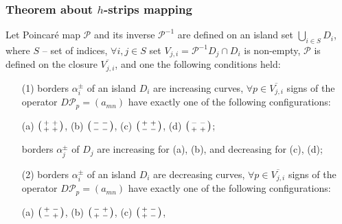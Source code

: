 \documentclass [10pt] {beamer}
\newenvironment{psm}
	{\left( \begin{smallmatrix}}
	{\end{smallmatrix} \right) }
\begin{document}
\begin{frame}
	\frametitle{Theorem about $h$-strips mapping}
	\begin{theorem}
		Let Poincar\'e map $\mathcal{P}$ and its inverse $\mathcal{P}^{-1}$ are defined on an island set $\bigcup_{i \in S} D_i$, where $S$ -- set of indices, $\forall i, j \in S$ set $V_{j,i} = \mathcal{P}^{-1} D_j \cap D_i$ is non-empty, $\mathcal{P}$ is defined on the closure $\overline{V_{j,i}}$, and one the following conditions held:
		\begin{enumerate}
			\item[(1)] borders $\alpha_i^{\pm}$ of an island $D_i$ are increasing curves, $\forall p \in \overline{V_{j,i}}$ signs of the operator $D \mathcal{P}_p = (a_{mn})$ have exactly one of the following configurations:
				\begin{center}
					(a) $\begin{psm} + & + \\ + & + \end{psm}$, \quad
					(b) $\begin{psm} - & - \\ - & - \end{psm}$, \quad
					(c) $\begin{psm} + & + \\ - & - \end{psm}$, \quad
					(d) $\begin{psm} - & - \\ + & + \end{psm}$;
				\end{center}
				borders $\alpha_j^{\pm}$ of $D_j$ are increasing for (a), (b), and decreasing for (c), (d);
			\item[(2)] borders $\alpha_i^{\pm}$ of an island $D_i$ are decreasing curves, $\forall p \in \overline{V_{j,i}}$ signs of the operator $D \mathcal{P}_p = (a_{mn})$ 	have exactly one of the following configurations:
				\begin{center}
					(a) $\begin{psm} + & - \\ - & + \end{psm}$, \quad
					(b) $\begin{psm} - & + \\ + & - \end{psm}$,	\quad
					(c) $\begin{psm} + & - \\ + & - \end{psm}$, \quad

\end{center}
\end{enumerate}
\end{theorem}
\end{frame}
\end{document}

